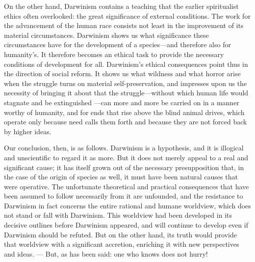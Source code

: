 \documentclass[12pt,a4paper]{article}
\begin{document}
On the other hand, Darwinism contains a teaching that the earlier
spiritualist ethics often overlooked: the great significance of
external conditions. The work for the advancement of the human race
consists not least in the improvement of its material circumstances.
Darwinism shows us what significance these circumstances have for the
development of a species---and therefore also for humanity's. It
therefore becomes an ethical task to provide the necessary conditions
of development for all. Darwinism's ethical consequences point thus
in the direction of social reform. It shows us what wildness and what
horror arise when the struggle turns on material self-preservation,
and impresses upon us the necessity of bringing it about that the
struggle---without which human life would stagnate and be extinguished
---can more and more be carried on in a manner worthy of humanity, and
for ends that rise above the blind animal drives, which operate only
because need calls them forth and because they are not forced back by
higher ideas.

Our conclusion, then, is as follows. Darwinism is a hypothesis, and
it is illogical and unscientific to regard it as more. But it does
not merely appeal to a real and significant cause; it has itself grown
out of the necessary presupposition that, in the case of the origin
of species as well, it must have been natural causes that were
operative. The unfortunate theoretical and practical consequences that
have been assumed to follow necessarily from it are unfounded, and
the resistance to Darwinism in fact concerns the entire rational and
humane worldview, which does not stand or fall with Darwinism. This
worldview had been developed in its decisive outlines before Darwinism
appeared, and will continue to develop even if Darwinism should be
refuted. But on the other hand, its truth would provide that worldview
with a significant accretion, enriching it with new perspectives and
ideas. --- But, as has been said: one who knows does not hurry!
\end{document}
